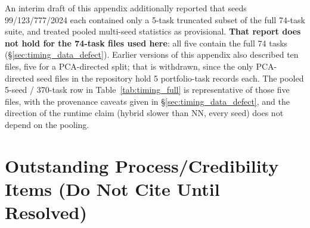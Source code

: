 \documentclass[twoside,11pt]{article}
\begin{document}
An interim draft of this appendix additionally reported that seeds
99/123/777/2024 each contained only a 5-task truncated subset of the full
74-task suite, and treated pooled multi-seed statistics as provisional.
\textbf{That report does not hold for the 74-task files used here}: all five
contain the full 74 tasks (\S\ref{sec:timing_data_defect}). Earlier versions
of this appendix also described ten files, five for a PCA-directed split;
that is withdrawn, since the only PCA-directed seed files in the repository
hold 5 portfolio-task records each. The pooled 5-seed / 370-task row in
Table~\ref{tab:timing_full} is representative of those five files, with the
provenance caveats given in \S\ref{sec:timing_data_defect}, and the
direction of the runtime claim (hybrid slower than NN, every seed) does not
depend on the pooling.

\section{Outstanding Process/Credibility Items (Do Not Cite Until Resolved)}\label{sec:process_items}
\end{document}
